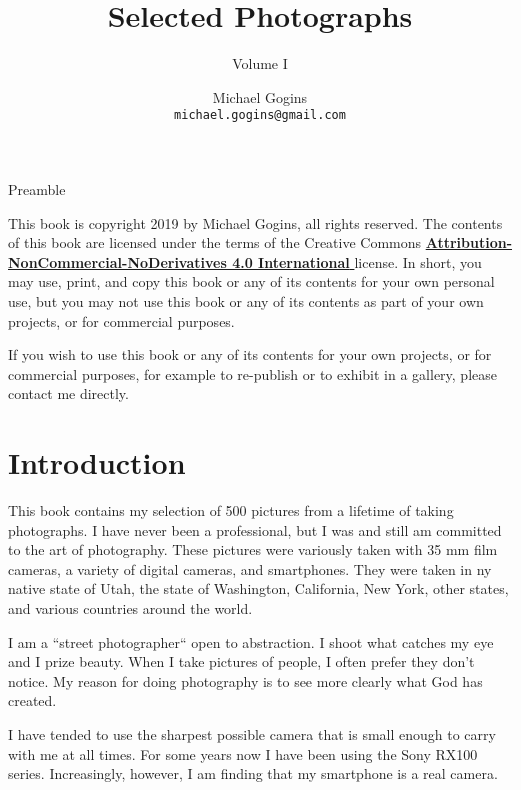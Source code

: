  {Preamble}

\frontmatter
\title{Selected Photographs}
\author{Michael Gogins \\ \texttt{michael.gogins@gmail.com}}
\subtitle{Volume I}
\dedication{This book is for Mick.}
\newpage
\noindent This book is copyright 2019 by Michael Gogins, all rights reserved. The contents of this book are licensed under the terms of the Creative Commons \href{https://creativecommons.org/licenses/by-nc-nd/4.0/legalcode}{\textbf{Attribution-NonCommercial-NoDerivatives 4.0 International} } license. In short, you may use, print, and copy this book or any of its contents for your own personal use, but you may not use this book or any of its contents as part of your own projects, or for commercial purposes.

If you wish to use this book or any of its contents for your own projects, or for commercial purposes, for example to re-publish or to exhibit in a gallery, please contact me directly.
\maketitle

\tableofcontents
\listoffigures

\mainmatter
\pagestyle{headings}

\chapter{Introduction}

This book contains my selection of 500 pictures from a lifetime of taking photographs. I have never been a professional, but I was and still am committed to the art of photography. These pictures were variously taken with 35 mm film cameras, a variety of digital cameras, and smartphones. They were taken in ny native state of Utah, the state of Washington, California, New York, other states, and various countries around the world. 

I am a ``street photographer`` open to abstraction. I shoot what catches my eye and I prize beauty. When I take pictures of people, I often prefer they don't notice. My reason for doing photography is to see more clearly what God has created.

I have tended to use the sharpest possible camera that is small enough to carry with me at all times. For some years now I have been using the Sony RX100 series. Increasingly, however, I am finding that my smartphone is a real camera.

